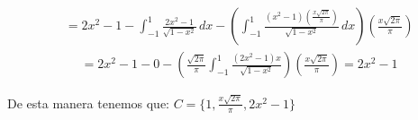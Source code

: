 \documentclass{report}
\begin{document}
\begin{enumerate}
\begin{itemize}
            \begin{align*}
            &= 2x^2 - 1 - \int_{-1}^1 \frac{2x^2 - 1}{\sqrt{1-x^2}} \, dx - \left(\int_{-1}^1 \frac{(x^2 - 1)\left(\frac{x\sqrt{2\pi}}{\pi}\right)}{\sqrt{1-x^2}} \, dx\right)\left( \frac{x\sqrt{2\pi}}{\pi}\right)
            \end{align*}
            \begin{align*}
            &= 2x^2-1-0-\left(\frac{\sqrt{2\pi}}{\pi}\int_{-1}^1\frac{(2x^2-1)x}{\sqrt{1-x^2}}\right)\left(\frac{x\sqrt{2\pi}}{\pi}\right)=2x^2-1
            \end{align*}
        \end{itemize}
    
      De esta manera tenemos que: $C=\{1,\frac{x\sqrt{2\pi}}{\pi},2x^2-1\}$
    

    \begin{center}
    \end{center}

    \begin{center}
    \end{center}


\end{enumerate}
\end{document}
